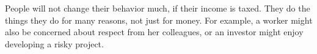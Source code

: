 People will not change their behavior much, if their income is taxed.
They do the things they do for many reasons, not just for money.
For example, a worker might also be concerned about respect from her colleagues, or an investor might enjoy developing a risky project.